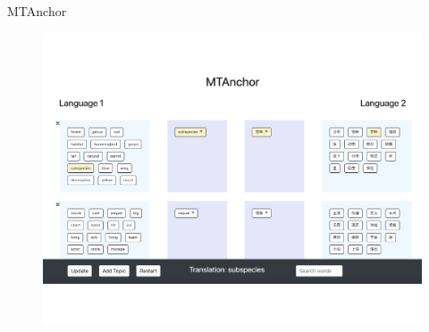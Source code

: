 \begin{frame}{MTAnchor}
\begin{figure}
\includegraphics[width=\textwidth]{topic_models/mtanchor/ui_final.pdf}
\end{figure}
\end{frame}


